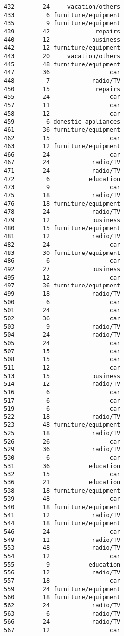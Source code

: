\documentclass[
]{article}
\begin{document}
\begin{verbatim}
432        24     vacation/others
433         6 furniture/equipment
435         9 furniture/equipment
439        42             repairs
440        12            business
442        12 furniture/equipment
443        20     vacation/others
445        48 furniture/equipment
447        36                 car
448         7            radio/TV
450        15             repairs
455        24                 car
457        11                 car
458        12                 car
459         6 domestic appliances
461        36 furniture/equipment
462        15                 car
463        12 furniture/equipment
466        24                 car
467        24            radio/TV
471        24            radio/TV
472         6           education
473         9                 car
475        18            radio/TV
476        18 furniture/equipment
478        24            radio/TV
479        12            business
480        15 furniture/equipment
481        12            radio/TV
482        24                 car
483        30 furniture/equipment
486         6                 car
492        27            business
495        12                 car
497        36 furniture/equipment
499        18            radio/TV
500         6                 car
501        24                 car
502        36                 car
503         9            radio/TV
504        24            radio/TV
505        24                 car
507        15                 car
508        15                 car
511        12                 car
513        15            business
514        12            radio/TV
516         6                 car
517         6                 car
519         6                 car
522        18            radio/TV
523        48 furniture/equipment
525        18            radio/TV
526        26                 car
529        36            radio/TV
530         6                 car
531        36           education
532        15                 car
536        21           education
538        18 furniture/equipment
539        48                 car
540        18 furniture/equipment
541        12            radio/TV
544        18 furniture/equipment
546        24                 car
549        12            radio/TV
553        48            radio/TV
554        12                 car
555         9           education
556        12            radio/TV
557        18                 car
559        24 furniture/equipment
560        18 furniture/equipment
562        24            radio/TV
563         6            radio/TV
566        24            radio/TV
567        12                 car

\end{verbatim}
\end{document}
